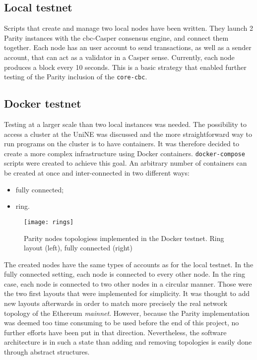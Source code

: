\subsection{Local testnet}
Scripts that create and manage two local nodes have been written. They launch 2
Parity instances with the \gls{cbc}-Casper consensus engine, and connect them
together. Each node has an user account to send transactions, as well as a
sender account, that can act as a validator in a Casper sense. Currently, each
node produces a block every 10 seconds. This is a basic strategy that enabled
further testing of the Parity inclusion of the \texttt{core-cbc}.

\subsection{Docker testnet}
Testing at a larger scale than two local instances was needed. The possibility
to access a cluster at the UniNE was discussed and the more straightforward way
to run programs on the cluster is to have containers. It was therefore decided
to create a more complex infrastructure using Docker containers.
\texttt{docker-compose} scripts were created to achieve this goal. An arbitrary
number of containers can be created at once and inter-connected in two different
ways:
\begin{itemize}
    \item fully connected;
    \item ring.
\end{itemize}

\begin{figure}
	\centering
	\texttt{[image: rings]}
  \captionsetup{justification=centering}
    \caption{Parity nodes topologiess implemented in the Docker testnet. Ring
    layout (left), fully connected (right)}
	\label{fig:example2}
\end{figure}

The created nodes have the same types of accounts as for the local testnet.
In the fully connected setting, each node is connected to every other node. In
the ring case, each node is connected to two other nodes in a circular manner.
Those were the two first layouts that were implemented for simplicity. It was
thought to add new layouts afterwards in order to match more precisely the real
network topology of the Ethereum \textit{mainnet}. However, because the Parity
implementation was deemed too time consuming to be used before the end of this
project, no further efforts have been put in that direction. Nevertheless, the
software architecture is in such a state than adding and removing topologies is
easily done through abstract structures.

